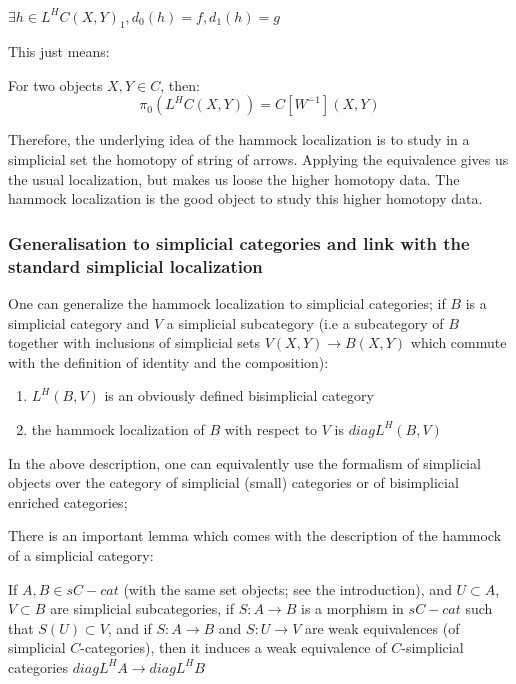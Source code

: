 \begin{center}
$\exists h \in L^H C(X,Y)_1 , d_0 (h)=f , d_1 (h)=g$
\end{center}

This just means:

\begin{prop}
For two objects $X,Y \in C$, then:
\begin{equation}
\pi_0 (L^H C(X,Y))=C[W^{-1}](X,Y)
\end{equation}
\end{prop}

Therefore, the underlying idea of the hammock localization is to study in a simplicial set the homotopy of string of arrows. Applying the equivalence gives us the usual localization, but makes us loose the higher homotopy data. The hammock localization is the good object to study this higher homotopy data.


\subsubsection{Generalisation to simplicial categories and link with the standard simplicial localization}

One can generalize the hammock localization to simplicial categories; if $B$ is a simplicial category and $V$ a simplicial subcategory (i.e a subcategory of $B$ together with inclusions of simplicial sets $V(X,Y) \rightarrow B(X,Y)$ which commute with the definition of identity and the composition):
\begin{enumerate}
\item $L^H(B,V)$ is an obviously defined bisimplicial category
\item the hammock localization of $B$ with respect to $V$ is $diag L^H(B,V)$
\end{enumerate}

\begin{rmk}
In the above description, one can equivalently use the formalism of simplicial objects over the category of simplicial (small) categories or of bisimplicial enriched categories;
\end{rmk}

There is an important lemma which comes with the description of the hammock of a simplicial category:

\begin{lemma}
If $A, B \in sC-cat$ (with the same set objects; see the introduction), and $U \subset A$, $V \subset B$ are simplicial subcategories, if $S : A \rightarrow B$ is a morphism in $sC-cat$ such that $S(U) \subset V$, and if $S:A \rightarrow B$ and $S: U \rightarrow V$ are weak equivalences (of simplicial $C$-categories), then it induces a weak equivalence of $C$-simplicial categories $diag L^H A \rightarrow diag L^H B$
\end{lemma}

